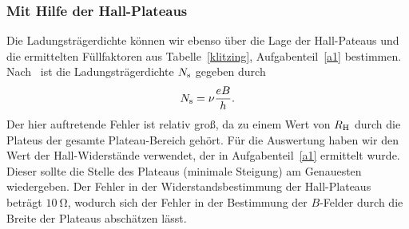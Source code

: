 \documentclass[paper=a4,fontsize=10pt,DIV=18,twocolumn,parskip=half]{scrartcl}
\numberwithin{equation}{section}    %
\begin{document}
\subsubsection*{Mit Hilfe der Hall-Plateaus}
Die Ladungsträgerdichte können wir ebenso über die Lage der Hall-Pateaus und die ermittelten Füllfaktoren aus Tabelle~\ref{klitzing}, Aufgabenteil~\ref{a1} bestimmen. Nach~\citet{anleitung} ist die Ladungsträgerdichte $N_{\rm s}$ gegeben durch
\begin{equation}
	N_{\rm s} = \nu\frac{e B}{h}.
\end{equation}
Der hier auftretende Fehler ist relativ groß, da zu einem Wert von $R_{\rm H}$ durch die Plateus der gesamte Plateau-Bereich gehört. Für die Auswertung haben wir den Wert der Hall-Widerstände verwendet, der in Aufgabenteil~\ref{a1} ermittelt wurde. Dieser sollte die Stelle des Plateaus (minimale Steigung) am Genauesten wiedergeben. Der Fehler in der Widerstandsbestimmung der Hall-Plateaus beträgt $\SI{10}{\ohm}$, wodurch sich der Fehler in der Bestimmung der $B$-Felder durch die Breite der Plateaus abschätzen lässt.
\end{document}

